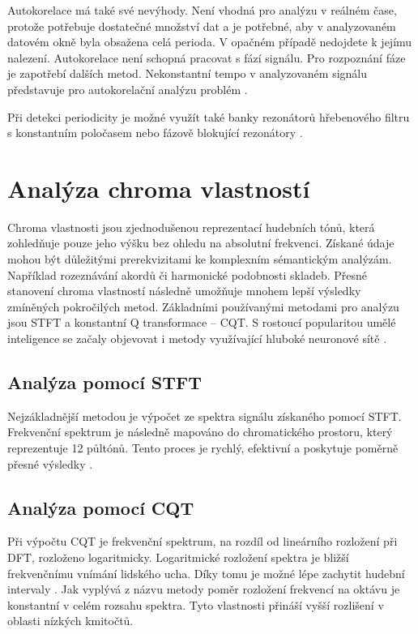     Autokorelace má také své nevýhody. Není vhodná pro analýzu v reálném čase, protože potřebuje dostatečné množství dat a je potřebné, aby v analyzovaném datovém okně byla obsažena celá perioda. V opačném případě nedojdete k jejímu nalezení. Autokorelace není schopná pracovat s fází signálu. Pro rozpoznání fáze je zapotřebí dalších metod. Nekonstantní tempo v analyzovaném signálu představuje pro autokorelační analýzu problém \cite{Tempo_and_metrical_analzsis_by_tracking_multiple_metrical_levels_using_autocorrelation}.

    Při detekci periodicity je možné využít také banky rezonátorů hřebenového filtru s konstantním poločasem \cite{Tempo_and_beat_analysis_of_acoustic_musical_signals} nebo fázově blokující rezonátory \cite{Resonance_and_the_perciption_of_musical_meter}.

\section{Analýza chroma vlastností} \label{sec:Chroma_vektory}
Chroma vlastnosti jsou zjednodušenou reprezentací hudebních tónů, která zohledňuje pouze jeho výšku bez ohledu na absolutní frekvenci. Získané údaje mohou být důležitými prerekvizitami ke komplexním sémantickým analýzám. Například rozeznávání akordů či harmonické podobnosti skladeb. Přesné stanovení chroma vlastností následně umožňuje mnohem lepší výsledky zmíněných pokročilých metod. Základními používanými metodami pro analýzu jsou \acs{STFT} a konstantní Q transformace -- \acs{CQT}. S rostoucí popularitou umělé inteligence se začaly objevovat i metody využívající hluboké neuronové sítě \cite{Chroma_feature_extraction}. 

  \subsection{Analýza pomocí STFT}
  Nejzákladnější metodou je výpočet ze spektra signálu získaného pomocí \acs{STFT}. Frekvenční spektrum je následně mapováno do chromatického prostoru, který reprezentuje 12 půltónů. Tento proces je rychlý, efektivní a poskytuje poměrně přesné výsledky \cite{Tonal_description}. 
  
  \subsection{Analýza pomocí CQT}
  Při výpočtu \acs{CQT} je frekvenční spektrum, na rozdíl od lineárního rozložení při \acs{DFT}, rozloženo logaritmicky. Logaritmické rozložení spektra je bližší frekvenčnímu vnímání lidského ucha. Díky tomu je možné lépe zachytit hudební intervaly \cite{Chroma_from_CQT}. Jak vyplývá z názvu metody poměr rozložení frekvencí na oktávu je konstantní v celém rozsahu spektra. Tyto vlastnosti přináší vyšší rozlišení v oblasti nízkých kmitočtů. 

